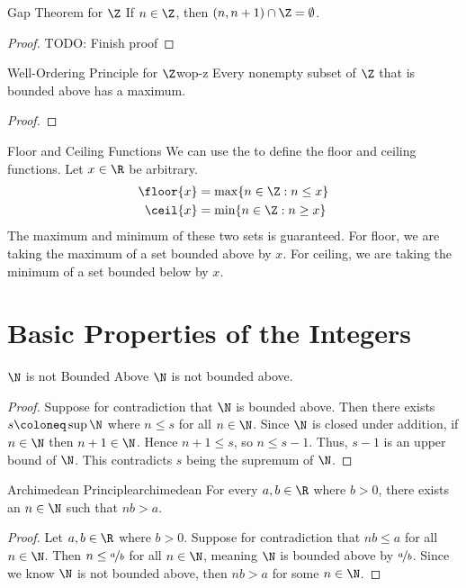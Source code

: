 \documentclass[letterpaper,12pt]{report}
\begin{document}
\begin{thmbox}{Gap Theorem for $\Z$}{}
	If $n \in \Z$, then $(n,n+1) \cap \Z = \emptyset$.
	\tcblower
	\begin{proof}
		TODO: Finish proof
	\end{proof}
\end{thmbox}

\begin{thmbox}{Well-Ordering Principle for $\Z$}{wop-z}
	Every nonempty subset of $\Z$ that is bounded above has a maximum.
	\tcblower
	\begin{proof}

	\end{proof}
\end{thmbox}

\begin{exbox}{Floor and Ceiling Functions}{}
	We can use the  to define the floor and ceiling functions. Let $x \in \R$ be arbitrary.
	\begin{align*}
		\floor{x} &= \max \{ n \in \Z : n \leq x \} \\
		\ceil{x} &= \min \{ n \in \Z : n \geq x \}
	\end{align*}
	The maximum and minimum of these two sets is guaranteed. For floor, we are taking the maximum of a set bounded above by $x$. For ceiling, we are taking the minimum of a set bounded below by $x$.
\end{exbox}

\section{Basic Properties of the Integers}

\begin{thmbox}{$\N$ is not Bounded Above}{}
	$\N$ is not bounded above.
	\tcblower
	\begin{proof}
		Suppose for contradiction that $\N$ is bounded above. Then there exists $s \coloneq \sup \N$ where $n \leq s$ for all $n \in \N$. Since $\N$ is closed under addition, if $n \in \N$ then $n+1 \in \N$. Hence $n+1 \leq s$, so $n \leq s - 1$. Thus, $s-1$ is an upper bound of $\N$. This contradicts $s$ being the supremum of $\N$.
	\end{proof}
\end{thmbox}

\begin{thmbox}{Archimedean Principle}{archimedean}
	For every $a,b \in \R$ where $b>0$, there exists an $n \in \N$ such that $nb>a$.
	\tcblower
	\begin{proof}
		Let $a,b \in \R$ where $b>0$. Suppose for contradiction that $nb \leq a$ for all $n \in \N$. Then $n \leq \nicefrac{a}{b}$ for all $n \in \N$, meaning $\N$ is bounded above by $\nicefrac{a}{b}$. Since we know $\N$ is not bounded above, then $nb > a$ for some $n \in \N$.
	\end{proof}
\end{thmbox}
\end{document}
